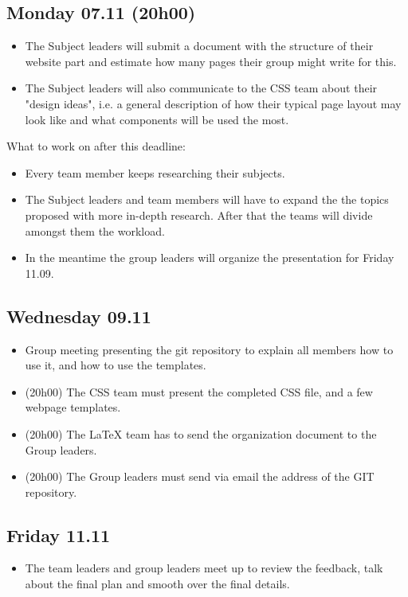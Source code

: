 \documentclass[12pt]{article}
\begin{document}
\subsection{Monday 07.11 \small{(20h00)}} 
\begin{itemize}[label=$\bullet$]
    \item The Subject leaders will submit a document with the structure of their website part and estimate how many pages their group might write for this.
    \item The Subject leaders will also communicate to the CSS team about their "design ideas", i.e. a general description of how their typical page layout may look like and what components will be used the most. 
\end{itemize}
What to work on after this deadline:
\begin{itemize}[label=$\bullet$]
    \item Every team member keeps researching their subjects.
    \item The Subject leaders and team members will have to expand the the topics proposed with more in-depth research. After that the teams will divide amongst them the workload.
    \item In the meantime the group leaders will organize the presentation for Friday 11.09.
\end{itemize}

\subsection{Wednesday 09.11}
\begin{itemize}[label=$\bullet$]
    \item Group meeting presenting the git repository to explain all members how to use it, and how to use the templates.
    \item {\footnotesize{(20h00)}} The CSS team must present the completed CSS file, and a few webpage templates.
    \item {\footnotesize{(20h00)}} The LaTeX team has to send the organization document to the Group leaders.
    \item {\footnotesize{(20h00)}} The Group leaders must send via email the address of the GIT repository.
\end{itemize}
 
\subsection{Friday 11.11}
\begin{itemize}[label=$\bullet$]
    \item The team leaders and group leaders meet up to review the feedback, talk about the final plan and smooth over the final details.
\end{itemize}
\end{document}
